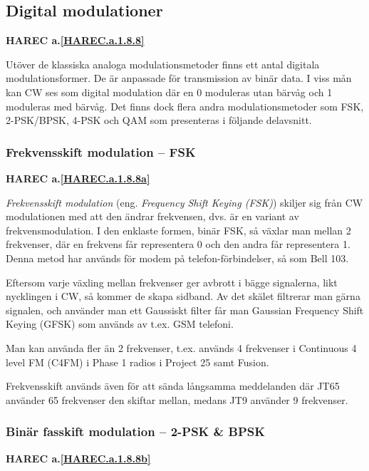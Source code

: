 \subsection{Digital modulationer}
\textbf{HAREC a.\ref{HAREC.a.1.8.8}\label{myHAREC.a.1.8.8}}

Utöver de klassiska analoga modulationsmetoder finns ett antal digitala
modulationsformer. De är anpassade för transmission av binär data. I viss mån
kan CW ses som digital modulation där en 0 moduleras utan bärvåg och 1 moduleras
med bärvåg. Det finns dock flera andra modulationsmetoder som FSK, 2-PSK/BPSK,
4-PSK och QAM som presenteras i följande delavsnitt.

\subsubsection{Frekvensskift modulation -- FSK}
\textbf{HAREC a.\ref{HAREC.a.1.8.8a}\label{myHAREC.a.1.8.8a}}

\emph{Frekvensskift modulation} (eng. \emph{Frequency Shift Keying (FSK)})
skiljer sig från CW modulationen med att den ändrar frekvensen, dvs. är en
variant av frekvensmodulation. I den enklaste formen, binär FSK, så växlar man
mellan 2 frekvenser, där en frekvens får representera 0 och den andra får
representera 1. Denna metod har används för modem på telefon-förbindelser,
så som Bell 103.

Eftersom varje växling mellan frekvenser ger avbrott i bägge signalerna,
likt nycklingen i CW, så kommer de skapa sidband. Av det skälet filtrerar man
gärna signalen, och använder man ett Gaussiskt filter får man Gaussian Frequency
Shift Keying (GFSK) som används av t.ex. GSM telefoni.

Man kan använda fler än 2 frekvenser, t.ex. används 4 frekvenser i Continuous
4 level FM (C4FM) i Phase 1 radios i Project 25 samt Fusion.

Frekvensskift används även för att sända långsamma meddelanden där JT65
använder 65 frekvenser den skiftar mellan, medans JT9 använder 9 frekvenser.

\subsubsection{Binär fasskift modulation -- 2-PSK \& BPSK}
\textbf{HAREC a.\ref{HAREC.a.1.8.8b}\label{myHAREC.a.1.8.8b}}

